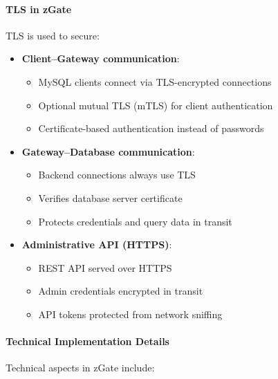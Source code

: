 \paragraph{TLS in zGate}

TLS is used to secure:

\begin{itemize}
    \item \textbf{Client–Gateway communication}:
    \begin{itemize}
        \item MySQL clients connect via TLS-encrypted connections
        \item Optional mutual TLS (mTLS) for client authentication
        \item Certificate-based authentication instead of passwords
    \end{itemize}
    
    \item \textbf{Gateway–Database communication}:
    \begin{itemize}
        \item Backend connections always use TLS
        \item Verifies database server certificate
        \item Protects credentials and query data in transit
    \end{itemize}
    
    \item \textbf{Administrative API (HTTPS)}:
    \begin{itemize}
        \item REST API served over HTTPS
        \item Admin credentials encrypted in transit
        \item API tokens protected from network sniffing
    \end{itemize}
\end{itemize}

\paragraph{Technical Implementation Details}

Technical aspects in zGate include:

